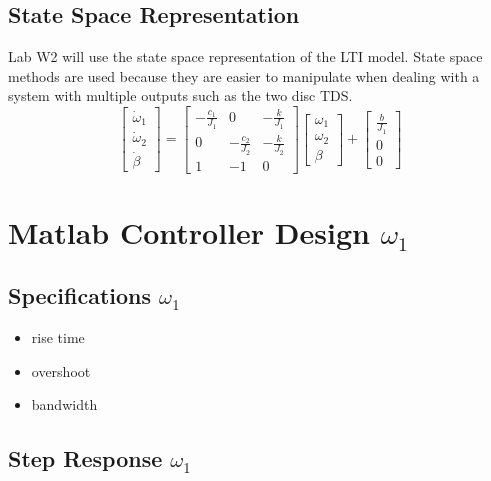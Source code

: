 \documentclass[11pt,titlepage]{article}
\begin{document}
	\subsection{State Space Representation}
		Lab W2 will use the state space representation of the LTI model. State space methods are used because they are easier to manipulate when dealing with a system with multiple outputs such as the two disc TDS.
		\begin{equation}
			\begin{bmatrix}
				\dot \omega_1\\
				\dot \omega_2\\
				\dot \beta
			\end{bmatrix}=
	  		\begin{bmatrix}
	    		-\frac{c_1}{J_1} & 0 & -\frac{k}{J_1} \\
		    	0 & -\frac{c_2}{J_2} & -\frac{k}{J_2}\\
				1 & -1 & 0
	  		\end{bmatrix}
			\begin{bmatrix}
				\omega_1\\
				\omega_2\\
				\beta
			\end{bmatrix}+
			\begin{bmatrix}
				\frac{b}{J_1}\\
				0\\
				0
			\end{bmatrix}
		\end{equation}

\section{Matlab Controller Design $\omega_1$}
	
	\subsection{Specifications $\omega_1$}
		\begin{itemize}
			\item rise time
			\item overshoot
			\item bandwidth
		\end{itemize}

	\subsection{Step Response $\omega_1$}
\end{document}
